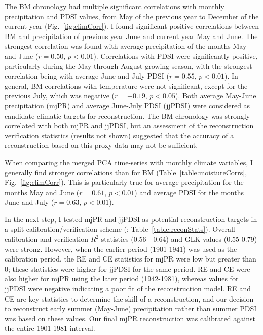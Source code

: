 The BM chronology had multiple significant correlations with monthly precipitation and PDSI values, from May of the previous year to December of the current year (Fig.~\ref{fig:climCorr}). I found significant positive correlations between BM and precipitation of previous year June and current year May and June. The strongest correlation was found with average precipitation of the months May and June ($r=0.50$, $p<0.01$). Correlations with PDSI were significantly positive, particularly during the May through August growing season, with the strongest correlation being with average June and July PDSI ($r=0.55$, $p<0.01$). In general, BM correlations with temperature were not significant, except for the previous July, which was negative ($r=-0.19$, $p<0.05$). Both average May-June precipitation (mjPR) and average June-July PDSI (jjPDSI) were considered as candidate climatic targets for reconstruction. The BM chronology was strongly correlated with both mjPR and jjPDSI, but an assessment of the reconstruction verification statistics (results not shown) suggested that the accuracy of a reconstruction based on this proxy data may not be sufficient.  

When comparing the merged PCA time-series with monthly climate variables, I generally find stronger correlations than for BM (Table~\ref{table:moistureCorrs}, Fig.~\ref{fig:climCorr}). This is particularly true for average precipitation for the months May and June ($r=0.61$, $p<0.01$) and average PDSI for the months June and July ($r=0.63$, $p<0.01$).

In the next step, I tested mjPR and jjPDSI as potential reconstruction targets in a split calibration/verification scheme (\cite{fritts1990methods}; Table~\ref{table:reconStats}). Overall calibration and verification $R^2$ statistics (0.56 - 0.64) and GLK values (0.55-0.79) were strong. However, when the earlier period (1901-1941) was used as the calibration period, the RE and CE statistics for mjPR were low but greater than 0; these statistics were higher for jjPDSI for the same period. RE and CE were also higher for mjPR using the later period (1942-1981), whereas values for jjPDSI were negative indicating a poor fit of the reconstruction model. RE and CE are key statistics to determine the skill of a reconstruction, and our decision to reconstruct early summer (May-June) precipitation rather than summer PDSI was based on these values. Our final mjPR reconstruction was calibrated against the entire 1901-1981 interval.

